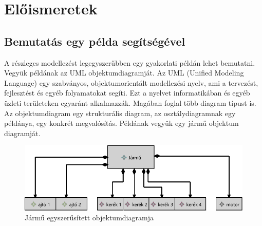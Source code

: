 \chapter{Előismeretek}

\section{Bemutatás egy példa segítségével}
A részleges modellezést legegyszerűbben egy gyakorlati példán lehet bemutatni. Vegyük példának az UML objektumdiagramját. Az UML (Unified Modeling Language) egy szabványos, objektumorientált modellezési nyelv, ami a tervezést, fejlesztést és egyéb folyamatokat segíti. Ezt a nyelvet informatikában és egyéb üzleti területeken egyaránt alkalmazzák. Magában foglal több diagram típust is.
Az objektumdiagram egy strukturális diagram, az osztálydiagramnak egy példánya, egy konkrét megvalósítás. Példának vegyük egy jármű objektum diagramját. 

\begin{figure}[!ht]
	\centering
	\includegraphics[width=120mm]{figures/vehicle.pdf}
	\caption{Jármű egyszerűsített objektumdiagramja} 
\end{figure}

